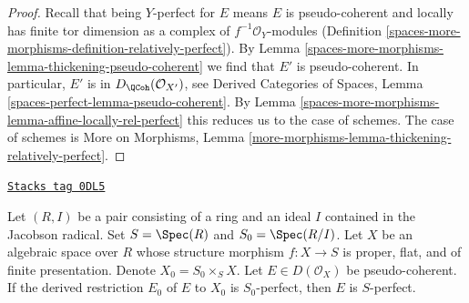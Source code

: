 \begin{proof}
Recall that being $Y$-perfect for $E$ means $E$ is
pseudo-coherent and locally has finite tor dimension as a complex
of $f^{-1}\mathcal{O}_Y$-modules
(Definition \ref{spaces-more-morphisms-definition-relatively-perfect}).
By Lemma \ref{spaces-more-morphisms-lemma-thickening-pseudo-coherent}
we find that $E'$ is pseudo-coherent.
In particular, $E'$ is in $D_\QCoh(\mathcal{O}_{X'})$, see
Derived Categories of Spaces, Lemma
\ref{spaces-perfect-lemma-pseudo-coherent}.
By Lemma \ref{spaces-more-morphisms-lemma-affine-locally-rel-perfect}
this reduces us to the case of schemes.
The case of schemes is
More on Morphisms, Lemma
\ref{more-morphisms-lemma-thickening-relatively-perfect}.
\end{proof}

\begin{lemma}
\label{spaces-more-morphisms-lemma-henselian-relatively-perfect}
\href{https://stacks.math.columbia.edu/tag/0DL5}{\texttt{Stacks tag 0DL5}}

Let $(R, I)$ be a pair consisting of a ring and an ideal $I$
contained in the Jacobson radical. Set $S = \Spec(R)$ and $S_0 = \Spec(R/I)$.
Let $X$ be an algebraic space over $R$ whose structure morphism
$f : X \to S$ is proper, flat, and of finite presentation.
Denote $X_0 = S_0 \times_S X$. Let $E \in D(\mathcal{O}_X)$
be pseudo-coherent. If the derived restriction $E_0$ of $E$
to $X_0$ is $S_0$-perfect, then $E$ is $S$-perfect.
\end{lemma}

